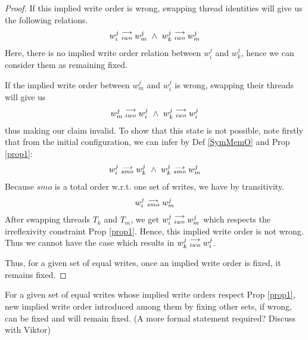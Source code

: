 \begin{proof}
                If this implied write order is wrong, swapping thread identities will give us the following relations. 
                \begin{align*}
                    \reln{w_i^j}{iwo}{w_m^j} \ \wedge \ \reln{w_k^j}{iwo}{w_m^j}
                \end{align*}
                Here, there is no implied write order relation between $w_i^j$ and $w_k^j$, hence we can consider them as remaining fixed. 

                If the implied write order between $w_m^j$ and $w_i^j$ is wrong, swapping their threads will give us 
                \begin{align*}
                    \reln{w_m^j}{iwo}{w_i^j} \ \wedge \ \reln{w_k^j}{iwo}{w_i^j}  
                \end{align*}
                thus making our claim invalid. To show that this state is not possible, note firstly that from the initial configuration, we    can infer by Def \ref{SymMemO} and Prop \ref{prop1}:
                \begin{align*}
                    \reln{w_i^j}{smo}{w_k^j} \ \wedge \ \reln{w_k^j}{smo}{w_m^j}
                \end{align*} 
                Because $smo$ is a total order w.r.t. one set of writes, we have by transitivity. 
                \begin{align*}
                    w_i^j\stackrel{\longrightarrow}{_{smo}}w_m^j
                \end{align*}
                After swapping threads $T_k$ and $T_m$, we get $w_i^j\stackrel{\longrightarrow}{_{iwo}}w_m^j$ which respects the irreflexivity constraint Prop \ref {prop1}. Hence, this implied write order is not wrong. Thus we cannot have the case which results in $w_k^j\stackrel{\longrightarrow}{_{iwo}}w_i^j   $.  


            Thus, for a given set of equal writes, once an implied write order is fixed, it remains fixed.
        \end{proof}


        \begin{lemma}
            For a given set of equal writes whose implied write orders respect Prop \ref{prop1},  new implied write order introduced among them by fixing other sets, if wrong, can be fixed and will remain fixed. 
            (A more formal statement required? Discuss with Viktor)        
        \end{lemma}

